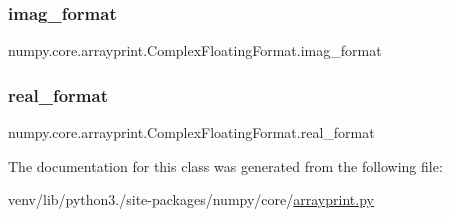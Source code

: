 \subsubsection{\texorpdfstring{imag\+\_\+format}{imag\_format}}
{\footnotesize\ttfamily numpy.\+core.\+arrayprint.\+Complex\+Floating\+Format.\+imag\+\_\+format}

\mbox{\label{classnumpy_1_1core_1_1arrayprint_1_1ComplexFloatingFormat_a997f83d88459bce70561027ba3d98a0d}} 
\subsubsection{\texorpdfstring{real\+\_\+format}{real\_format}}
{\footnotesize\ttfamily numpy.\+core.\+arrayprint.\+Complex\+Floating\+Format.\+real\+\_\+format}



The documentation for this class was generated from the following file\+:\begin{DoxyCompactItemize}
\item 
venv/lib/python3./site-\/packages/numpy/core/\hyperlink{core_2arrayprint_8py}{arrayprint.\+py}\end{DoxyCompactItemize}
